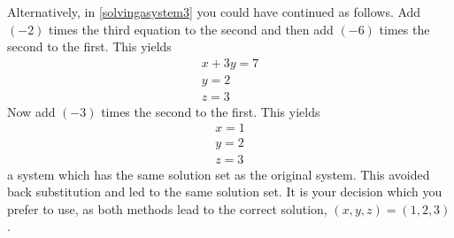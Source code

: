 \begin{solution}
Alternatively, in \ref{solvingasystem3} you could have continued as follows. Add $\left(
-2\right) $ times the third equation to the second and then add $\left(
-6\right) $ times the second to the first. This yields
\begin{equation*}
\allowbreak
\begin{array}{c}
x+3y=7 \\
y=2 \\
z=3
\end{array}
\end{equation*}
Now add $\left( -3\right) $ times the second to the first. This yields
\begin{equation*}
\allowbreak
\begin{array}{c}
x=1 \\
y=2 \\
z=3
\end{array}
\end{equation*}
a system which has the same solution set as the original system. This
avoided back substitution and led to the same solution set. It is your decision which you prefer to use, as both methods lead to the correct solution,
$\left( x,y,z \right) = \left(1,2,3\right)$.
\end{solution}
